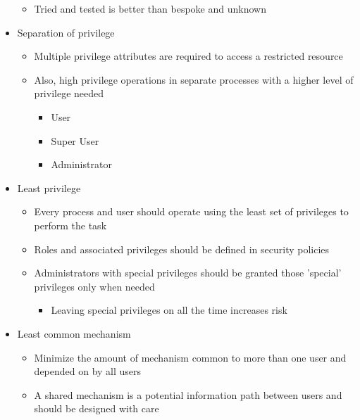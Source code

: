 \documentclass[12pt]{article}
\begin{document}
\begin{itemize}
\begin{itemize}
                    \item Tried and tested is better than bespoke and unknown
                \end{itemize}
            \item Separation of privilege
                \begin{itemize}
                    \item Multiple privilege attributes are required to access a restricted resource
                    \item Also, high privilege operations in separate processes with a higher level of
                    privilege needed
                        \begin{itemize}
                            \item User
                            \item Super User
                            \item Administrator
                        \end{itemize}
                \end{itemize}
            \item Least privilege
                \begin{itemize}
                    \item Every process and user should operate using the least set of privileges to perform the task
                    \item Roles and associated privileges should be defined in security policies
                    \item Administrators with special privileges should be granted those 'special' privileges
                    only when needed
                        \begin{itemize}
                            \item Leaving special privileges on all the time increases risk
                        \end{itemize}
                \end{itemize}
            \item Least common mechanism
                \begin{itemize}
                    \item Minimize the amount of mechanism common to more than one user and depended on by all users
                    \item A shared mechanism is a potential information path between users and should be designed
                    with care

\end{itemize}
\end{itemize}
\end{document}
